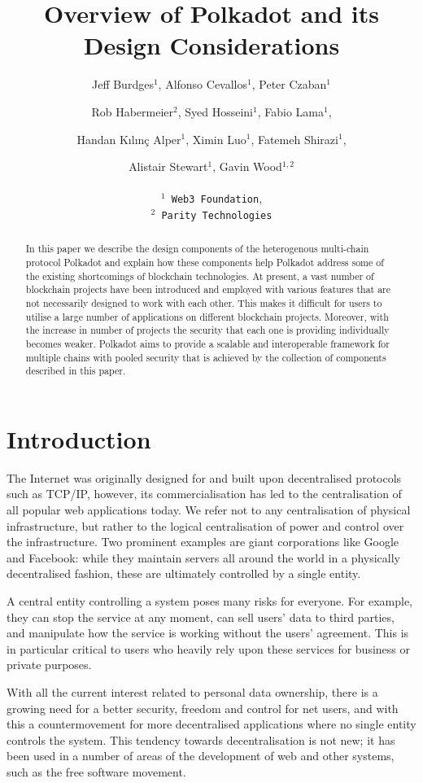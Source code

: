 \documentclass{article}
\title{Overview of Polkadot and its Design Considerations}
\author{
  Jeff Burdges$^1$, Alfonso Cevallos$^1$, Peter Czaban$^1$\\
  \and
  Rob Habermeier$^2$, Syed Hosseini$^1$, Fabio Lama$^1$,\\
  \and
  Handan K{\i}l{\i}n\c{c} Alper$^1$, Ximin Luo$^1$, Fatemeh Shirazi$^1$, \\
  \and
  Alistair Stewart$^1$, Gavin Wood$^{1,2}$\\
  \\
  \texttt{$^1$ Web3 Foundation},\\
  \texttt{$^2$ Parity Technologies}
}
\begin{document}
\maketitle

\begin{abstract}
In this paper we describe the design components of the heterogenous multi-chain protocol Polkadot and explain how these components help Polkadot address some of the existing shortcomings of blockchain technologies.
At present, a vast number of blockchain projects have been introduced and employed with various features that are not necessarily designed to work  with each other.  This makes it difficult for users to utilise a large number of applications on different blockchain projects. Moreover, with the increase in number of projects the security that each one is providing individually becomes weaker.
Polkadot aims to provide a scalable and interoperable framework for multiple chains with pooled security that is achieved by the collection of components described in this paper.
\end{abstract}

\tableofcontents
\newpage
\section{Introduction}\label{sec:intro}
The Internet was originally designed for and built upon decentralised protocols such as TCP/IP, however, its commercialisation has led to the centralisation of all popular web applications today. We refer not to any centralisation of physical infrastructure, but rather to the logical centralisation of power and control over the infrastructure. Two prominent examples are giant corporations like Google and Facebook: while they maintain servers all around the world in a physically decentralised fashion, these are ultimately controlled by a single entity.

A central entity controlling a system poses many risks for everyone. For example, they can stop the service at any moment, can sell users' data to third parties, and manipulate how the service is working without the users' agreement. This is in particular critical to users who heavily rely upon these services for business or private purposes.

With all the current interest related to personal data ownership, there is a growing need for a better security, freedom and control for net users, and with this a countermovement for more decentralised applications where no single entity controls the system. This tendency towards decentralisation is not new; it has been used in a number of areas of the development of web and other systems, such as the free software movement. %
\end{document}

